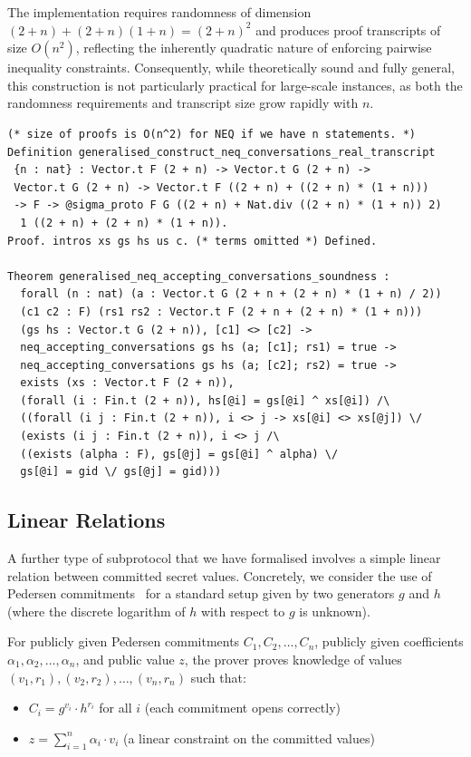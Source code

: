 \documentclass[sigconf, anonymous]{acmart}
\begin{document}
The implementation \texttt{} requires randomness of dimension \((2+n) + (2+n)(1+n) = (2+n)^2\) and produces proof transcripts of size \(O(n^2)\), reflecting the inherently quadratic nature of enforcing pairwise inequality constraints. Consequently, while theoretically sound and fully general, this construction is not particularly practical for large-scale instances, as both the randomness requirements and transcript size grow rapidly with \(n\).

\begin{lstlisting}[frame=single, language=Coq, caption={Neq $\Sigma$ Protocol},
label={neq_special_sound},captionpos=t, basicstyle=\ttfamily\footnotesize,
abovecaptionskip=-\medskipamount]
(* size of proofs is O(n^2) for NEQ if we have n statements. *) 
Definition generalised_construct_neq_conversations_real_transcript 
 {n : nat} : Vector.t F (2 + n) -> Vector.t G (2 + n) -> 
 Vector.t G (2 + n) -> Vector.t F ((2 + n) + ((2 + n) * (1 + n))) 
 -> F -> @sigma_proto F G ((2 + n) + Nat.div ((2 + n) * (1 + n)) 2) 
  1 ((2 + n) + (2 + n) * (1 + n)).
Proof. intros xs gs hs us c. (* terms omitted *) Defined. 

Theorem generalised_neq_accepting_conversations_soundness :
  forall (n : nat) (a : Vector.t G (2 + n + (2 + n) * (1 + n) / 2)) 
  (c1 c2 : F) (rs1 rs2 : Vector.t F (2 + n + (2 + n) * (1 + n))) 
  (gs hs : Vector.t G (2 + n)), [c1] <> [c2] ->
  neq_accepting_conversations gs hs (a; [c1]; rs1) = true ->
  neq_accepting_conversations gs hs (a; [c2]; rs2) = true ->
  exists (xs : Vector.t F (2 + n)), 
  (forall (i : Fin.t (2 + n)), hs[@i] = gs[@i] ^ xs[@i]) /\
  ((forall (i j : Fin.t (2 + n)), i <> j -> xs[@i] <> xs[@j]) \/
  (exists (i j : Fin.t (2 + n)), i <> j /\ 
  ((exists (alpha : F), gs[@j] = gs[@i] ^ alpha) \/ 
  gs[@i] = gid \/ gs[@j] = gid)))
\end{lstlisting}

\subsection{Linear Relations}
A further type of subprotocol that we have formalised involves a simple linear relation between committed secret values.
Concretely, we consider the use of Pedersen commitments~\cite{pedersen1991non} for a standard setup given by two generators $g$ 
and $h$ (where the discrete logarithm of $h$ with respect to $g$ is unknown). 

For publicly given Pedersen commitments $C_1, C_2, \ldots, C_n$, publicly given coefficients $\alpha_1, \alpha_2, \ldots, \alpha_n$,
and public value $z$, the prover proves knowledge of values $(v_1, r_1), (v_2, r_2), \ldots, (v_n, r_n)$ such that:
\begin{itemize}
\item $C_i = g^{v_i} \cdot h^{r_i}$ for all $i$ (each commitment opens correctly)
\item $z = \sum_{i=1}^{n} \alpha_i \cdot v_i$ (a linear constraint on the committed values)
\end{itemize}
\end{document}
